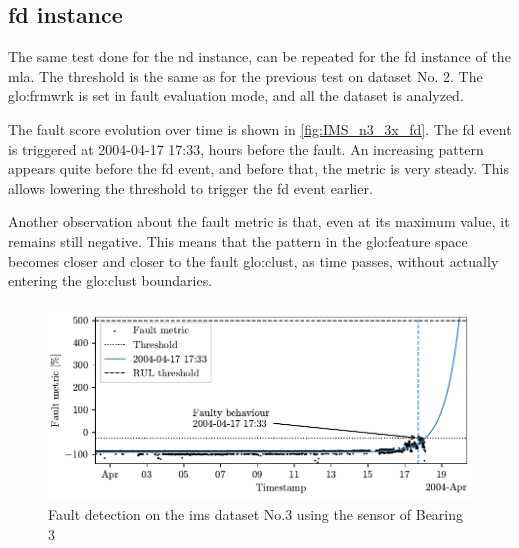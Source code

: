 \subsection{\gls{fd} instance}

The same test done for the \gls{nd} instance, can be repeated for the \gls{fd} instance of the \gls{mla}. The threshold is the same as for the previous test on dataset No. 2. The \gls{glo:frmwrk} is set in fault evaluation mode, and all the dataset is analyzed. 

The fault score evolution over time is shown in \autoref{fig:IMS_n3_3x_fd}. 
The \gls{fd} event is triggered at 2004-04-17 17:33, hours before the fault.
An increasing pattern appears quite before the \gls{fd} event, and before that, the metric is very steady. This allows lowering the threshold to trigger the \gls{fd} event earlier.

Another observation about the fault metric is that, even at its maximum value, it remains still negative. This means that the pattern in the \gls{glo:feature} space becomes closer and closer to the fault \gls{glo:clust}, as time passes, without actually entering the \gls{glo:clust} boundaries.

\begin{figure}
    \centering
    \includegraphics{images/IMS/Test03/FD.pdf}
    \caption{Fault detection on the \gls{ims} dataset No.3 using the sensor of Bearing 3}
    \label{fig:IMS_n3_3x_fd}
\end{figure}
